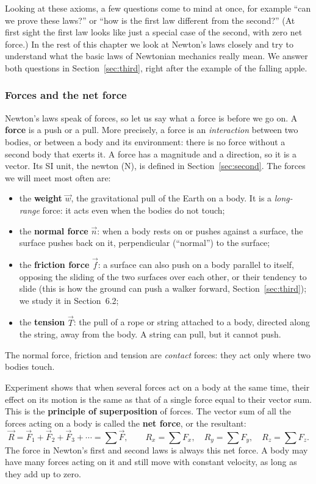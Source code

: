\documentclass[11pt,a4paper]{article}
\begin{document}
Looking at these axioms, a few questions come to mind at once, for example ``can we prove these
laws?'' or ``how is the first law different from the second?'' (At first sight the first law looks
like just a special case of the second, with zero net force.) In the rest of this chapter we look
at Newton's laws closely and try to understand what the basic laws of Newtonian mechanics really
mean. We answer both questions in Section~\ref{sec:third}, right after the example of the falling
apple.

\subsubsection{Forces and the net force}\label{sec:forces}

Newton's laws speak of forces, so let us say what a force is before we go on. A \textbf{force} is a
push or a pull. More precisely, a force is an \emph{interaction} between two bodies, or between a
body and its environment: there is no force without a second body that exerts it. A force has a
magnitude and a direction, so it is a vector. Its SI unit, the newton (\unit{N}), is defined in
Section~\ref{sec:second}. The forces we will meet most often are:
\begin{itemize}
  \item the \textbf{weight} $\vec{w}$, the gravitational pull of the Earth on a body. It is a
    \emph{long-range} force: it acts even when the bodies do not touch;
  \item the \textbf{normal force} $\vec{n}$: when a body rests on or pushes against a surface, the
    surface pushes back on it, perpendicular (``normal'') to the surface;
  \item the \textbf{friction force} $\vec{f}$: a surface can also push on a body parallel to
    itself, opposing the sliding of the two surfaces over each other, or their tendency to slide
    (this is how the ground can push a walker forward, Section~\ref{sec:third}); we study it in
    Section~6.2;
  \item the \textbf{tension} $\vec{T}$: the pull of a rope or string attached to a body, directed
    along the string, away from the body. A string can pull, but it cannot push.
\end{itemize}
The normal force, friction and tension are \emph{contact} forces: they act only where two bodies
touch.

Experiment shows that when several forces act on a body at the same time, their effect on its
motion is the same as that of a single force equal to their vector sum. This is the
\textbf{principle of superposition} of forces. The vector sum of all the forces acting on a body is
called the \textbf{net force}, or the resultant:
\[
  \vec{R} = \vec{F}_1 + \vec{F}_2 + \vec{F}_3 + \cdots = \sum \vec{F} , \qquad
  R_x = \sum F_x , \quad R_y = \sum F_y , \quad R_z = \sum F_z .
\]
The force in Newton's first and second laws is always this net force. A body may have many forces
acting on it and still move with constant velocity, as long as they add up to zero.
\end{document}
